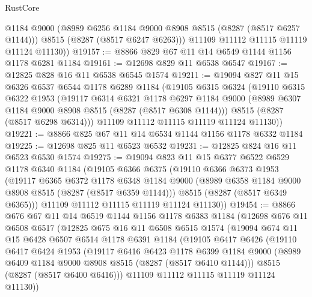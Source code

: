 \begin{lexlean}{RustCore}
\begin{coremodule}
          @1184
          @9000
          (@8989 @6256 @1184 @9000 @8908 @8515 (@8287 (@8517 @6257 @1144)))
          @8515
          (@8287 (@8517 @6247 @6263)))
        @11109
        @11112
        @11115
        @11119
        @11124
        @11130))
@19157 := @8866 @829 @67 @11 @14 @6549 @1144 @1156 @1178 @6281 @1184
@19161 := @12698 @829 @11 @6538 @6547
@19167 := @12825 @828 @16 @11 @6538 @6545 @1574
@19211 := @19094
    @827
    @11
    @15
    @6326
    @6537
    @6544
    @1178
    @6289
    @1184
    (@19105
      @6315
      @6324
      (@19110
        @6315
        @6322
        @1953
        (@19117
          @6314
          @6321
          @1178
          @6297
          @1184
          @9000
          (@8989 @6307 @1184 @9000 @8908 @8515 (@8287 (@8517 @6308 @1144)))
          @8515
          (@8287 (@8517 @6298 @6314)))
        @11109
        @11112
        @11115
        @11119
        @11124
        @11130))
@19221 := @8866 @825 @67 @11 @14 @6534 @1144 @1156 @1178 @6332 @1184
@19225 := @12698 @825 @11 @6523 @6532
@19231 := @12825 @824 @16 @11 @6523 @6530 @1574
@19275 := @19094
    @823
    @11
    @15
    @6377
    @6522
    @6529
    @1178
    @6340
    @1184
    (@19105
      @6366
      @6375
      (@19110
        @6366
        @6373
        @1953
        (@19117
          @6365
          @6372
          @1178
          @6348
          @1184
          @9000
          (@8989 @6358 @1184 @9000 @8908 @8515 (@8287 (@8517 @6359 @1144)))
          @8515
          (@8287 (@8517 @6349 @6365)))
        @11109
        @11112
        @11115
        @11119
        @11124
        @11130))
@19454 := @8866
    @676
    @67
    @11
    @14
    @6519
    @1144
    @1156
    @1178
    @6383
    @1184
    (@12698
      @676
      @11
      @6508
      @6517
      (@12825
        @675
        @16
        @11
        @6508
        @6515
        @1574
        (@19094
          @674
          @11
          @15
          @6428
          @6507
          @6514
          @1178
          @6391
          @1184
          (@19105
            @6417
            @6426
            (@19110
              @6417
              @6424
              @1953
              (@19117
                @6416
                @6423
                @1178
                @6399
                @1184
                @9000
                (@8989 @6409 @1184 @9000 @8908 @8515 (@8287 (@8517 @6410 @1144)))
                @8515
                (@8287 (@8517 @6400 @6416)))
              @11109
              @11112
              @11115
              @11119
              @11124
              @11130))

\end{coremodule}
\end{lexlean}
